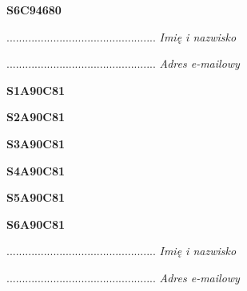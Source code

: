 \begin{turn}{90}\huge \textbf{S6C94680}\end{turn}

\begin{turn}{90}\begin{minipage}{\linewidth} \vspace{20mm} ................................................  \textit{Imię i nazwisko}\end{minipage}\end{turn}

\begin{turn}{90}\begin{minipage}{\linewidth} \vspace{20mm} ................................................  \textit{Adres e-mailowy}\end{minipage}\end{turn}

\begin{turn}{90}\huge \textbf{S1A90C81}\end{turn}

\begin{turn}{90}\huge \textbf{S2A90C81}\end{turn}

\begin{turn}{90}\huge \textbf{S3A90C81}\end{turn}

\begin{turn}{90}\huge \textbf{S4A90C81}\end{turn}

\begin{turn}{90}\huge \textbf{S5A90C81}\end{turn}

\begin{turn}{90}\huge \textbf{S6A90C81}\end{turn}

\begin{turn}{90}\begin{minipage}{\linewidth} \vspace{20mm} ................................................  \textit{Imię i nazwisko}\end{minipage}\end{turn}

\begin{turn}{90}\begin{minipage}{\linewidth} \vspace{20mm} ................................................  \textit{Adres e-mailowy}\end{minipage}\end{turn}

